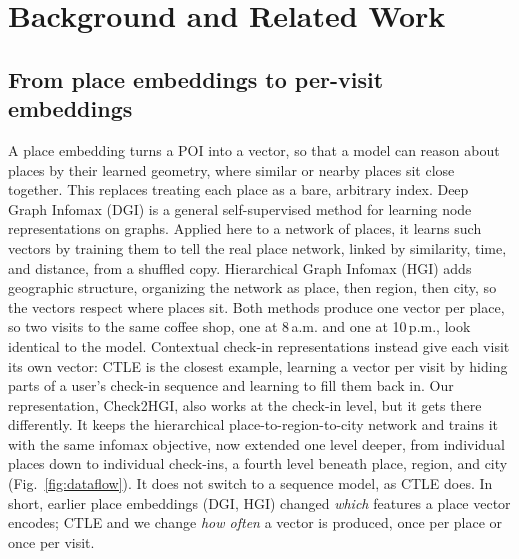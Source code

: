 \section{Background and Related Work}
\label{sec:related}

\subsection{From place embeddings to per-visit embeddings}
\label{sec:related-embeddings}
A place embedding turns a POI into a vector, so that a model can reason about
places by their learned geometry, where similar or nearby places sit close
together. This replaces treating each place as a bare, arbitrary index.
Deep Graph Infomax (DGI) \cite{velickovic2019dgi} is a general self-supervised
method for learning node representations on graphs. Applied here to a network
of places, it learns such vectors by training them to tell the real place
network, linked by similarity, time, and distance, from a shuffled copy.
Hierarchical Graph Infomax (HGI) \cite{huang2023hgi} adds geographic structure,
organizing the network as place, then region, then city, so the vectors respect
where places sit. Both methods produce one vector per place, so two visits to the
same coffee shop, one at 8\,a.m. and one at 10\,p.m., look identical to the model.
Contextual check-in representations instead give each visit its own vector: CTLE
\cite{lin2021ctle} is the closest example, learning a vector per visit by hiding
parts of a user's check-in sequence and learning to fill them back in. Our
representation, Check2HGI, also works at the check-in level, but it gets there
differently. It keeps the hierarchical place-to-region-to-city network and trains
it with the same infomax objective, now extended one level deeper, from individual
places down to individual check-ins, a fourth level beneath place, region, and
city (Fig.~\ref{fig:dataflow}). It does not switch to a sequence model, as CTLE
does. In short, earlier place embeddings (DGI, HGI) changed \emph{which} features
a place vector encodes; CTLE and we change \emph{how often} a vector is produced,
once per place or once per visit.

